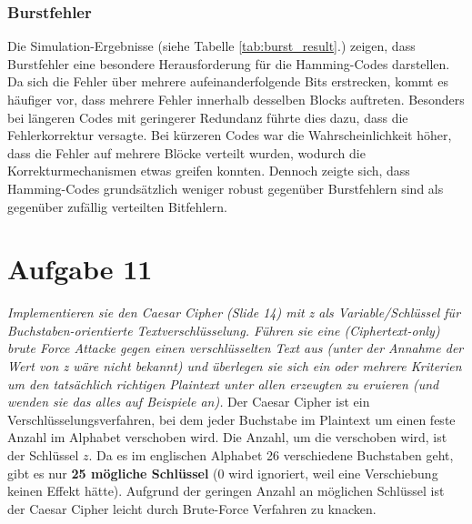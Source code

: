 \documentclass{article}
\begin{document}
    
    \subsubsection{Burstfehler}  
    Die Simulation-Ergebnisse (siehe Tabelle \ref{tab:burst_result}.) zeigen, dass Burstfehler eine besondere Herausforderung für die Hamming-Codes darstellen. 
    Da sich die Fehler über mehrere aufeinanderfolgende Bits erstrecken, kommt es häufiger vor, dass mehrere Fehler 
    innerhalb desselben Blocks auftreten. Besonders bei längeren Codes mit geringerer Redundanz führte dies dazu, 
    dass die Fehlerkorrektur versagte. Bei kürzeren Codes war die Wahrscheinlichkeit höher, dass die Fehler auf mehrere 
    Blöcke verteilt wurden, wodurch die Korrekturmechanismen etwas greifen konnten. Dennoch zeigte sich, 
    dass Hamming-Codes grundsätzlich weniger robust gegenüber Burstfehlern sind als gegenüber zufällig verteilten 
    Bitfehlern.
    
    \newpage
    \section{Aufgabe 11}
    \textit{Implementieren sie den Caesar Cipher (Slide 14) mit z als Variable/Schlüssel für
    Buchstaben-orientierte Textverschlüsselung. Führen sie eine (Ciphertext-only) brute
    Force Attacke gegen einen verschlüsselten Text aus (unter der Annahme der Wert
    von z wäre nicht bekannt) und überlegen sie sich ein oder mehrere Kriterien um den
    tatsächlich richtigen Plaintext unter allen erzeugten zu eruieren (und wenden sie das
    alles auf Beispiele an).}\vspace*{1em}\newline
    Der Caesar Cipher ist ein Verschlüsselungsverfahren, bei dem jeder Buchstabe im Plaintext um einen feste Anzahl
    im Alphabet verschoben wird. Die Anzahl, um die verschoben wird, ist der Schlüssel $z$. Da es im englischen Alphabet
    26 verschiedene Buchstaben geht, gibt es nur \textbf{25 mögliche Schlüssel} (0 wird ignoriert, weil eine Verschiebung 
    keinen Effekt hätte). Aufgrund der geringen Anzahl an möglichen Schlüssel ist der Caesar Cipher leicht durch Brute-Force 
    Verfahren zu knacken.
\end{document}

